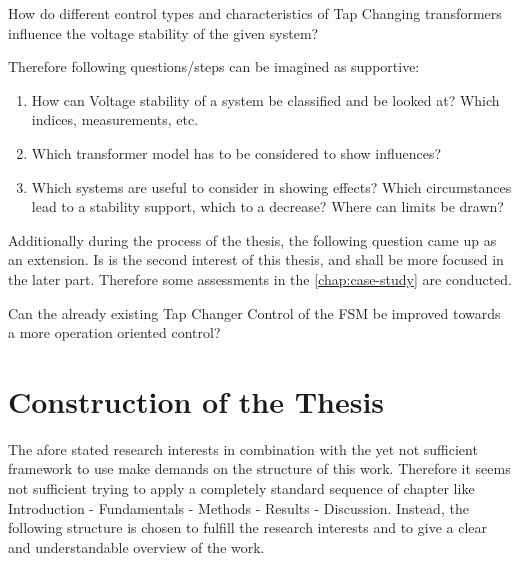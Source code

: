 \begin{tcolorbox}[float, colback=ees_blue!5!white,colframe=ees_blue, toptitle=1mm, bottomtitle=1mm, left=2mm, right=2.5mm, top=2mm, bottom=2mm, title={\textbf{Research Question of this Thesis}}]
    How do different control types and characteristics of Tap Changing transformers influence the voltage stability of the given system?
\end{tcolorbox}

Therefore following questions/steps can be imagined as supportive:
\begin{enumerate}
    \item How can Voltage stability of a system be classified and be looked at? Which indices, measurements, etc.
    \item Which transformer model has to be considered to show influences?
    \item Which systems are useful to consider in showing effects? Which circumstances lead to a stability support, which to a decrease? Where can limits be drawn?
\end{enumerate}

Additionally during the process of the thesis, the following question came up as an extension. Is is the second interest of this thesis, and shall be more focused in the later part. Therefore some assessments in the \autoref{chap:case-study} are conducted.

\begin{tcolorbox}[float, colback=ees_green!5!white,colframe=ees_green, toptitle=1mm, bottomtitle=1mm, left=2mm, right=2.5mm, top=2mm, bottom=2mm, title={\textbf{Additional Question of this Thesis}}]
    Can the already existing Tap Changer Control of the \acf{FSM} be improved towards a more operation oriented control?
\end{tcolorbox}

\section{Construction of the Thesis}

The afore stated research interests in combination with the yet not sufficient framework to use make demands on the structure of this work. Therefore it seems not sufficient trying to apply a completely standard sequence of chapter like \glqq Introduction - Fundamentals - Methods - Results - Discussion\grqq. Instead, the following structure is chosen to fulfill the research interests and to give a clear and understandable overview of the work.


